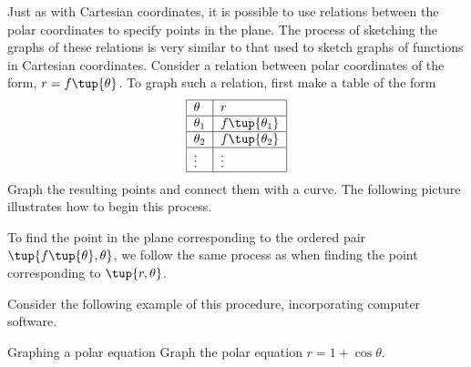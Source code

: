 Just as with Cartesian coordinates, it is possible to use
relations between the polar coordinates to specify points in the plane. The
process of sketching the graphs of these relations is very similar to that used to sketch
graphs of functions in Cartesian coordinates. Consider a relation between polar coordinates of the form, $r=f\tup{\theta }$. To graph such a relation, first make a table of
the form 
\begin{equation*}
\begin{tabular}{|l|l|}
\hline
$\theta $ & $r$ \\ \hline
$\theta _{1}$ & $f\tup{\theta _{1}} $ \\ \hline
$\theta _{2}$ & $f\tup{\theta _{2}} $ \\ \hline
$\vdots $ & $\vdots $ \\ \hline
\end{tabular}
\end{equation*}
Graph the resulting points and connect them with a curve. The
following picture illustrates how to begin this process.

\begin{center}
\end{center}

To find the point in the plane corresponding to the ordered pair $\tup{f\tup{
\theta } ,\theta } $, we follow the same process as when finding the point corresponding to $\tup{r, \theta }$.

Consider the following example of this procedure, incorporating computer software.

\begin{example}{Graphing a polar equation}{}
Graph the polar equation $r=1+\cos \theta$.
\end{example}

